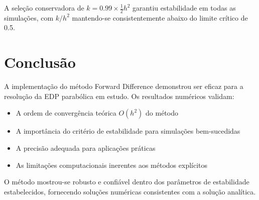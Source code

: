 \documentclass[a4paper, 12pt]{article}
\begin{document}
A seleção conservadora de $k = 0.99 \times \frac{1}{2}h^2$ garantiu estabilidade em todas as simulações, com $k/h^2$ mantendo-se consistentemente abaixo do limite crítico de 0.5.

\section{Conclusão}

A implementação do método Forward Difference demonstrou ser eficaz para a resolução da EDP parabólica em estudo. Os resultados numéricos validam:

\begin{itemize}
    \item A ordem de convergência teórica $O(h^2)$ do método
    \item A importância do critério de estabilidade para simulações bem-sucedidas
    \item A precisão adequada para aplicações práticas
    \item As limitações computacionais inerentes aos métodos explícitos
\end{itemize}

O método mostrou-se robusto e confiável dentro dos parâmetros de estabilidade estabelecidos, fornecendo soluções numéricas consistentes com a solução analítica.
\end{document}
